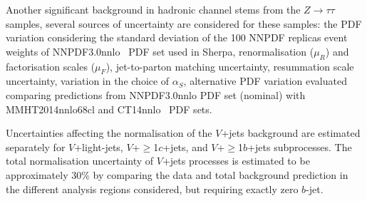 \documentclass[PAPER, coverpage, atlasdraft=true, texlive=2016, UKenglish]{\ATLASLATEXPATH atlasdoc}
\begin{document}
Another significant background in hadronic channel stems from the $Z\rightarrow \tau\tau$ samples, several sources of uncertainty are
considered for these samples: the PDF variation considering the standard deviation of the 100 NNPDF replicas event weights
of NNPDF3.0nnlo~\cite{Ball:2015NNPDF} PDF
set used in Sherpa, renormalisation ($\mu_{R}$) and factorisation scales ($\mu_{F}$), jet-to-parton matching uncertainty, resummation scale uncertainty,
variation in the choice of $\alpha_{S}$, alternative PDF variation evaluated comparing predictions from NNPDF3.0nnlo PDF set (nominal)
with MMHT2014nnlo68cl and CT14nnlo~\cite{Lai:2010vv,Gao:2013xoa} PDF sets.

Uncertainties affecting the normalisation of the $V$+jets background are estimated separately for $V$+light-jets, $V$+$\geq$1$c$+jets,
and $V$+$\geq$1$b$+jets subprocesses. The total normalisation uncertainty of $V$+jets processes is estimated to be approximately 30\% by comparing the
data and total background prediction in the different analysis regions considered, but requiring exactly zero $b$-jet.


\end{document}
